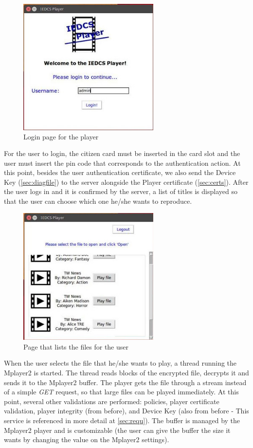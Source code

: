 \documentclass[11pt,a4paper]{report}
\begin{document}
\begin{figure}[H]
\centerline{\includegraphics[width=200pt]{images/playerLogin.jpg}}
\caption{Login page for the player}
\label{player}
\end{figure}

For the user to login, the citizen card must be inserted in the card slot and the user must insert the pin code that corresponds to the authentication action. At this point, besides the user authentication certificate, we also send the Device Key (\autoref{sec:diagfile}) to the server alongside the Player certificate (\autoref{sec:certs}).
\newline After the user logs in and it is confirmed by the server, a list of titles is displayed so that the user can choose which one he/she wants to reproduce.

\begin{figure}[H]
\centerline{\includegraphics[width=200pt]{images/playerList.jpg}}
\caption{Page that lists the files for the user}
\label{player}
\end{figure}

When the user selects the file that he/she wants to play, a thread running the Mplayer2 is started. The thread reads blocks of the encrypted file, decrypts it and sends it to the Mplayer2 buffer.
The player gets the file through a stream instead of a simple \emph{GET} request, so that large files can be played immediately.
At this point, several other validations are performed: policies, player certificate validation, player integrity (from before), and Device Key (also from before - This service is referenced in more detail at \autoref{sec:requ}).
\newline
The buffer is managed by the Mplayer2 player and is customizable (the user can give the buffer the size it wants by changing the value on the Mplayer2 settings).
\end{document}
